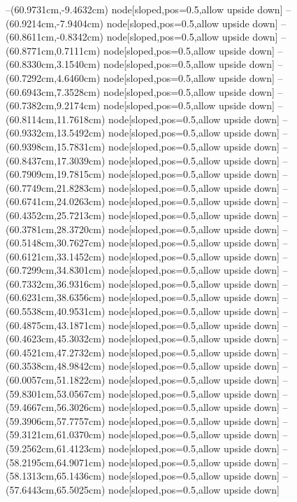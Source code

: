--(60.9731cm,-9.4632cm) node[sloped,pos=0.5,allow upside down]{\ArrowIn}
--(60.9214cm,-7.9404cm) node[sloped,pos=0.5,allow upside down]{\ArrowIn}
--(60.8611cm,-0.8342cm) node[sloped,pos=0.5,allow upside down]{\ArrowIn}
--(60.8771cm,0.7111cm) node[sloped,pos=0.5,allow upside down]{\ArrowIn}
--(60.8330cm,3.1540cm) node[sloped,pos=0.5,allow upside down]{\ArrowIn}
--(60.7292cm,4.6460cm) node[sloped,pos=0.5,allow upside down]{\ArrowIn}
--(60.6943cm,7.3528cm) node[sloped,pos=0.5,allow upside down]{\ArrowIn}
--(60.7382cm,9.2174cm) node[sloped,pos=0.5,allow upside down]{\ArrowIn}
--(60.8114cm,11.7618cm) node[sloped,pos=0.5,allow upside down]{\ArrowIn}
--(60.9332cm,13.5492cm) node[sloped,pos=0.5,allow upside down]{\ArrowIn}
--(60.9398cm,15.7831cm) node[sloped,pos=0.5,allow upside down]{\ArrowIn}
--(60.8437cm,17.3039cm) node[sloped,pos=0.5,allow upside down]{\ArrowIn}
--(60.7909cm,19.7815cm) node[sloped,pos=0.5,allow upside down]{\ArrowIn}
--(60.7749cm,21.8283cm) node[sloped,pos=0.5,allow upside down]{\ArrowIn}
--(60.6741cm,24.0263cm) node[sloped,pos=0.5,allow upside down]{\ArrowIn}
--(60.4352cm,25.7213cm) node[sloped,pos=0.5,allow upside down]{\ArrowIn}
--(60.3781cm,28.3720cm) node[sloped,pos=0.5,allow upside down]{\ArrowIn}
--(60.5148cm,30.7627cm) node[sloped,pos=0.5,allow upside down]{\ArrowIn}
--(60.6121cm,33.1452cm) node[sloped,pos=0.5,allow upside down]{\ArrowIn}
--(60.7299cm,34.8301cm) node[sloped,pos=0.5,allow upside down]{\ArrowIn}
--(60.7332cm,36.9316cm) node[sloped,pos=0.5,allow upside down]{\ArrowIn}
--(60.6231cm,38.6356cm) node[sloped,pos=0.5,allow upside down]{\ArrowIn}
--(60.5538cm,40.9531cm) node[sloped,pos=0.5,allow upside down]{\ArrowIn}
--(60.4875cm,43.1871cm) node[sloped,pos=0.5,allow upside down]{\ArrowIn}
--(60.4623cm,45.3032cm) node[sloped,pos=0.5,allow upside down]{\ArrowIn}
--(60.4521cm,47.2732cm) node[sloped,pos=0.5,allow upside down]{\ArrowIn}
--(60.3538cm,48.9842cm) node[sloped,pos=0.5,allow upside down]{\ArrowIn}
--(60.0057cm,51.1822cm) node[sloped,pos=0.5,allow upside down]{\ArrowIn}
--(59.8301cm,53.0567cm) node[sloped,pos=0.5,allow upside down]{\ArrowIn}
--(59.4667cm,56.3026cm) node[sloped,pos=0.5,allow upside down]{\ArrowIn}
--(59.3906cm,57.7757cm) node[sloped,pos=0.5,allow upside down]{\ArrowIn}
--(59.3121cm,61.0370cm) node[sloped,pos=0.5,allow upside down]{\ArrowIn}
--(59.2562cm,61.4123cm) node[sloped,pos=0.5,allow upside down]{\arrowIn}
--(58.2195cm,64.9071cm) node[sloped,pos=0.5,allow upside down]{\ArrowIn}
--(58.1313cm,65.1436cm) node[sloped,pos=0.5,allow upside down]{\arrowIn}
--(57.6443cm,65.5025cm) node[sloped,pos=0.5,allow upside down]{\arrowIn}
